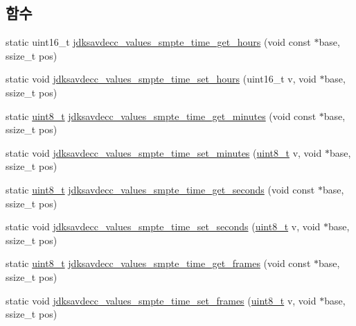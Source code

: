 \subsection*{함수}
\begin{DoxyCompactItemize}
\item 
static uint16\+\_\+t \hyperlink{group__values__smpte__time_ga7f7cf39f2ab761c9b1b52e0e7285e8c6}{jdksavdecc\+\_\+values\+\_\+smpte\+\_\+time\+\_\+get\+\_\+hours} (void const $\ast$base, ssize\+\_\+t pos)
\item 
static void \hyperlink{group__values__smpte__time_ga252c1a63bc857bbebce3ad36259db5cb}{jdksavdecc\+\_\+values\+\_\+smpte\+\_\+time\+\_\+set\+\_\+hours} (uint16\+\_\+t v, void $\ast$base, ssize\+\_\+t pos)
\item 
static \hyperlink{stdint_8h_aba7bc1797add20fe3efdf37ced1182c5}{uint8\+\_\+t} \hyperlink{group__values__smpte__time_ga97a364b9696c06dfb0bbbfe965f2947d}{jdksavdecc\+\_\+values\+\_\+smpte\+\_\+time\+\_\+get\+\_\+minutes} (void const $\ast$base, ssize\+\_\+t pos)
\item 
static void \hyperlink{group__values__smpte__time_ga22a43a5204eccef862c262f66675df66}{jdksavdecc\+\_\+values\+\_\+smpte\+\_\+time\+\_\+set\+\_\+minutes} (\hyperlink{stdint_8h_aba7bc1797add20fe3efdf37ced1182c5}{uint8\+\_\+t} v, void $\ast$base, ssize\+\_\+t pos)
\item 
static \hyperlink{stdint_8h_aba7bc1797add20fe3efdf37ced1182c5}{uint8\+\_\+t} \hyperlink{group__values__smpte__time_gab8ec4bcfb3994ccb1b5986d426fcdc49}{jdksavdecc\+\_\+values\+\_\+smpte\+\_\+time\+\_\+get\+\_\+seconds} (void const $\ast$base, ssize\+\_\+t pos)
\item 
static void \hyperlink{group__values__smpte__time_ga72b70e0e870366b9e2ddd5a5c1b7af79}{jdksavdecc\+\_\+values\+\_\+smpte\+\_\+time\+\_\+set\+\_\+seconds} (\hyperlink{stdint_8h_aba7bc1797add20fe3efdf37ced1182c5}{uint8\+\_\+t} v, void $\ast$base, ssize\+\_\+t pos)
\item 
static \hyperlink{stdint_8h_aba7bc1797add20fe3efdf37ced1182c5}{uint8\+\_\+t} \hyperlink{group__values__smpte__time_ga24e7326aa8f3f1d9396155ff7bdacbac}{jdksavdecc\+\_\+values\+\_\+smpte\+\_\+time\+\_\+get\+\_\+frames} (void const $\ast$base, ssize\+\_\+t pos)
\item 
static void \hyperlink{group__values__smpte__time_gae400a4fe95507407d977aa0f4124b07a}{jdksavdecc\+\_\+values\+\_\+smpte\+\_\+time\+\_\+set\+\_\+frames} (\hyperlink{stdint_8h_aba7bc1797add20fe3efdf37ced1182c5}{uint8\+\_\+t} v, void $\ast$base, ssize\+\_\+t pos)
\item 

\end{DoxyCompactItemize}
